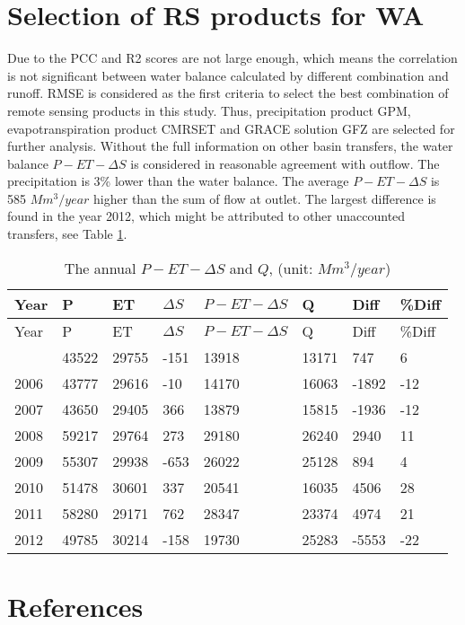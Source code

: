 \documentclass[oneside,openany]{article}%
\begin{document}
\section{Selection of RS products for WA}%
\label{sec:SelectionofRSproductsforWA}%
Due to the PCC and R2 scores are not large enough, which means the correlation is not significant between water balance calculated by different combination and runoff. RMSE is considered as the first criteria to select the best combination of remote sensing products in this study.%
\linebreak%
Thus, precipitation product GPM, evapotranspiration product CMRSET and GRACE solution GFZ are selected for further analysis.%
\linebreak%
Without the full information on other basin transfers, the water balance $P-ET-\Delta S$ is considered in reasonable agreement with outflow. The precipitation is 3\% lower than the water balance. The average $P-ET-\Delta S$ is 585 $Mm^3/year$ higher than the sum of flow at outlet. The largest difference is found in the year 2012, which might be attributed to other unaccounted transfers, see Table \ref{table:tab2}.%
\linebreak%
\begin{longtable}{|l|l|l|l|l|l|l|l|}%
\caption{The annual $P-ET-\Delta S$ and $Q$, (unit: $Mm^3/year$)}%
\label{table:tab2}\\%
\hline%
\textbf{Year}&\textbf{P}&\textbf{ET}&\textbf{$\Delta S$}&\textbf{$P-ET-\Delta S$}&\textbf{Q}&\textbf{Diff}&\textbf{\%Diff}\\%
\hline%
\endfirsthead%
\hline%
Year&P&ET&$\Delta S$&$P-ET-\Delta S$&Q&Diff&\%Diff\\%
\hline%
\endhead%
\hline%
\endfoot%
2005&43522&29755&{-}151&13918&13171&747&6\\%
2006&43777&29616&{-}10&14170&16063&{-}1892&{-}12\\%
2007&43650&29405&366&13879&15815&{-}1936&{-}12\\%
2008&59217&29764&273&29180&26240&2940&11\\%
2009&55307&29938&{-}653&26022&25128&894&4\\%
2010&51478&30601&337&20541&16035&4506&28\\%
2011&58280&29171&762&28347&23374&4974&21\\%
2012&49785&30214&{-}158&19730&25283&{-}5553&{-}22\\%
\end{longtable}

%
\newpage%
\section*{References}%
\label{sec:References}%
%
\printbibliography[heading=none]
\end{document}
